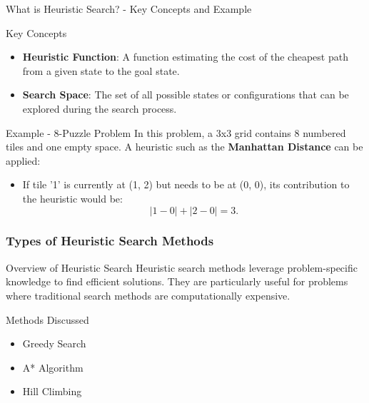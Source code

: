\documentclass[aspectratio=169]{beamer}
\begin{document}
\begin{frame}[fragile]{What is Heuristic Search? - Key Concepts and Example}
    \begin{block}{Key Concepts}
        \begin{itemize}
            \item \textbf{Heuristic Function}: A function estimating the cost of the cheapest path from a given state to the goal state.
            \item \textbf{Search Space}: The set of all possible states or configurations that can be explored during the search process.
        \end{itemize}
    \end{block}
    
    \begin{block}{Example - 8-Puzzle Problem}
        In this problem, a 3x3 grid contains 8 numbered tiles and one empty space. A heuristic such as the \textbf{Manhattan Distance} can be applied:
        \begin{itemize}
            \item If tile '1' is currently at (1, 2) but needs to be at (0, 0), its contribution to the heuristic would be:
            \[
            |1-0| + |2-0| = 3.
            \]
        \end{itemize}
    \end{block}
\end{frame}

\begin{frame}[fragile]
    \frametitle{Types of Heuristic Search Methods}
    \begin{block}{Overview of Heuristic Search}
        Heuristic search methods leverage problem-specific knowledge to find efficient solutions. They are particularly useful for problems where traditional search methods are computationally expensive.
    \end{block}
    \begin{block}{Methods Discussed}
        \begin{itemize}
            \item Greedy Search
            \item A* Algorithm
            \item Hill Climbing
        \end{itemize}
    \end{block}
\end{frame}
\end{document}
